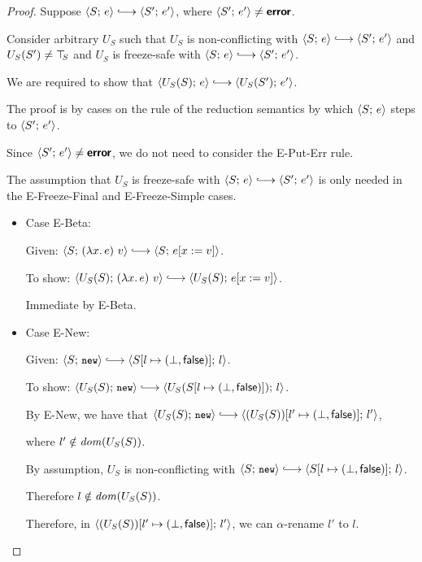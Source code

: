 \begin{proof}
  Suppose $\config{S}{e} \parstepsto \config{S'}{e'}$, where
  $\langle S';\, e' \rangle \neq \textbf{\textsf{error}}$.

  Consider arbitrary $U_S$ such that $U_S$ is non-conflicting with
  $\config{S}{e} \parstepsto \config{S'}{e'}$ and $U_S(S') \neq \top\hspace{-0.85mm}_{S}$
  and $U_S$ is freeze-safe with $\config{S}{e} \parstepsto
  \config{S'}{e'}$.

  We are required to show that $\config{U_S(S)}{e} \parstepsto
  \config{U_S(S')}{e'}$.

  The proof is by cases on the rule of the reduction semantics by
  which $\langle S;\, e \rangle$ steps to $\langle S';\, e' \rangle$.

  Since $\langle S';\, e' \rangle \neq \textbf{\textsf{error}}$, we do not need to consider the
  {\sc E-Put-Err} rule.

  The assumption that $U_S$ is freeze-safe with $\config{S}{e}
  \parstepsto \config{S'}{e'}$ is only needed in the {\sc
    E-Freeze-Final} and {\sc E-Freeze-Simple} cases.

  \begin{itemize}

  \item Case {\sc E-Beta}:

    Given: $\config{S}{\app{(\lam{x}{e})}{v}} \parstepsto
    \config{S}{\subst{e}{x}{v}}$.

    To show: $\config{U_S(S)}{\app{(\lam{x}{e})}{v}} \parstepsto
    \config{U_S(S)}{\subst{e}{x}{v}}$.

    Immediate by {\sc E-Beta}.

  \item Case {\sc E-New}:

    Given: $\config{S}{\NEW} \parstepsto
    \config{\extS{S}{l}{\bot}{\frozenfalse}}{l}$.

    To show: $\config{U_S(S)}{\NEW} \parstepsto
    \config{U_S(\extS{S}{l}{\bot}{\frozenfalse})}{l}$.

    By {\sc E-New}, we have that $\config{U_S(S)}{\NEW} \parstepsto
    \config{\extS{(U_S(S))}{l'}{\bot}{\frozenfalse}}{l'}$,

    where $l' \notin \mathit{dom}(U_S(S))$.

    By assumption, $U_S$ is non-conflicting with $\config{S}{\NEW}
    \parstepsto \config{\extS{S}{l}{\bot}{\frozenfalse}}{l}$.

    Therefore $l \notin \mathit{dom}(U_S(S))$.

    Therefore, in
    $\langle (U_S(S))[l' \mapsto (\bot, \textsf{false})];\, l' \rangle$, we can
    $\alpha$-rename $l'$ to $l$.


\end{itemize}
\end{proof}
